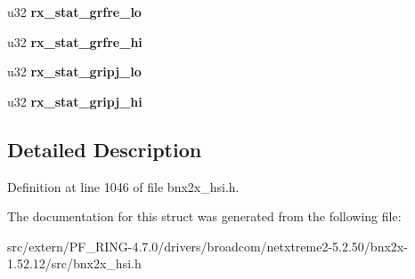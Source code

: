 \begin{DoxyCompactItemize}
\item 
\hypertarget{structbmac__stats_a23f5925790c57a40b2d59ca8fe7cc672}{
u32 {\bfseries rx\_\-stat\_\-grfre\_\-lo}}
\label{structbmac__stats_a23f5925790c57a40b2d59ca8fe7cc672}

\item 
\hypertarget{structbmac__stats_ac62b7470da7f1b8ce7e040877d92ae87}{
u32 {\bfseries rx\_\-stat\_\-grfre\_\-hi}}
\label{structbmac__stats_ac62b7470da7f1b8ce7e040877d92ae87}

\item 
\hypertarget{structbmac__stats_a558e7202a8015fd2d5cc4806b3a4f355}{
u32 {\bfseries rx\_\-stat\_\-gripj\_\-lo}}
\label{structbmac__stats_a558e7202a8015fd2d5cc4806b3a4f355}

\item 
\hypertarget{structbmac__stats_ac5ba4cf9c615f371148f41dccf17e50f}{
u32 {\bfseries rx\_\-stat\_\-gripj\_\-hi}}
\label{structbmac__stats_ac5ba4cf9c615f371148f41dccf17e50f}

\end{DoxyCompactItemize}


\subsection{Detailed Description}


Definition at line 1046 of file bnx2x\_\-hsi.h.



The documentation for this struct was generated from the following file:\begin{DoxyCompactItemize}
\item 
src/extern/PF\_\-RING-\/4.7.0/drivers/broadcom/netxtreme2-\/5.2.50/bnx2x-\/1.52.12/src/bnx2x\_\-hsi.h\end{DoxyCompactItemize}
